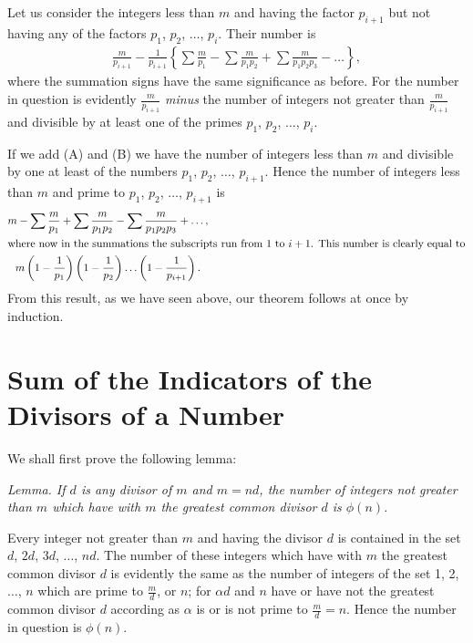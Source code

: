 \documentclass[oneside]{book}
\begin{document}
Let us consider the integers less than $m$ and having the factor
$p_{i+1}$ but not having any of the factors $p_1$, $p_2$, $\ldots$,
$p_i$. Their number is
\begin{gather}
\frac{m}{p_{i+1}} -
   \frac{1}{p_{i+1}} \left \{
   \sum \frac{m}{p_1} -
   \sum \frac{m}{p_1p_2} +
   \sum \frac{m}{p_1p_2p_3} -
   \ldots
   \right \}, \tag{B}
\end{gather}
where the summation signs have the same significance as before. For
the number in question is evidently $\frac{m}{p_{i+1}}$ \emph{minus}
the number of integers not greater than $\frac{m}{p_{i+1}}$ and
divisible by at least one of the primes $p_1$, $p_2$, $\ldots$,
$p_i$.

If we add (A) and (B) we have the number of integers less than $m$
and divisible by one at least of the numbers $p_1$, $p_2$, $\ldots$,
$p_{i+1}$. Hence the number of integers less than $m$ and prime to
$p_1$, $p_2$, $\ldots$, $p_{i+1}$ is
\begin{gather*}
m -
   \sum \frac{m}{p_1} +
   \sum \frac{m}{p_1 p_2} -
   \sum \frac{m}{p_1 p_2 p_3} +
   \ldots, \\
\intertext{where now in the summations the subscripts run from 1 to
$i+1$. This number is clearly equal to}
m
   \left ( 1 - \frac{1}{p_1} \right )
   \left ( 1 - \frac{1}{p_2} \right )
   \ldots
   \left ( 1 - \frac{1}{p_{i+1}} \right ).
\end{gather*}
From this result, as we have seen above, our theorem follows at once
by induction.

\section{Sum of the Indicators of the Divisors of a Number}%
\label{s17}

We shall first prove the following lemma:

\smallskip \emph{Lemma. If $d$ is any divisor of $m$ and $m = nd$,
the number of integers not greater than $m$ which have with $m$ the
greatest common divisor $d$ is $\phi(n)$.}

Every integer not greater than $m$ and having the divisor $d$ is
contained in the set $d$, $2d$, $3d$, $\ldots$, $nd$. The number of
these integers which have with $m$ the greatest common divisor $d$
is evidently the same as the number of integers of the set 1, 2,
$\ldots$, $n$ which are prime to $\frac{m}{d}$, or $n$; for $\alpha
d$ and $n$ have or have not the greatest common divisor $d$
according as $\alpha$ is or is not prime to $\frac{m}{d}=n$. Hence
the number in question is $\phi(n)$.
\end{document}
